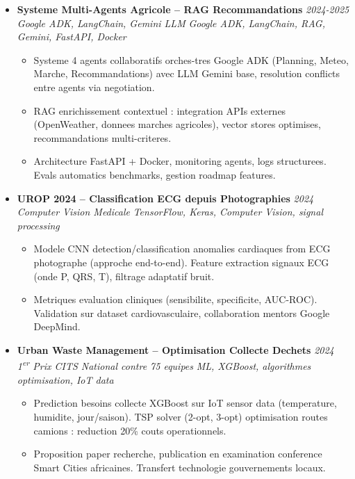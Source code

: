 \documentclass[a4paper,11pt]{article}
\begin{document}
\begin{itemize}[leftmargin=*, label={-}]
\item \textbf{Systeme Multi-Agents Agricole -- RAG Recommandations} \hfill \textit{2024-2025} \\
\textit{Google ADK, LangChain, Gemini LLM} \hfill \textit{Google ADK, LangChain, RAG, Gemini, FastAPI, Docker}
\vspace{-2pt}
    \begin{itemize}[leftmargin=0.4cm, nosep, label=\tiny$\bullet$]
        \item \small{Systeme 4 agents collaboratifs orches-tres Google ADK (Planning, Meteo, Marche, Recommandations) avec LLM Gemini base, resolution conflicts entre agents via negotiation.}
        \item \small{RAG enrichissement contextuel : integration APIs externes (OpenWeather, donnees marches agricoles), vector stores optimises, recommandations multi-criteres.}
        \item \small{Architecture FastAPI + Docker, monitoring agents, logs structurees. Evals automatics benchmarks, gestion roadmap features.}
    \end{itemize}
\vspace{3pt}

\item \textbf{UROP 2024 -- Classification ECG depuis Photographies} \hfill \textit{2024} \\
\textit{Computer Vision Medicale} \hfill \textit{TensorFlow, Keras, Computer Vision, signal processing}
\vspace{-2pt}
    \begin{itemize}[leftmargin=0.4cm, nosep, label=\tiny$\bullet$]
        \item \small{Modele CNN detection/classification anomalies cardiaques from ECG photographe (approche end-to-end). Feature extraction signaux ECG (onde P, QRS, T), filtrage adaptatif bruit.}
        \item \small{Metriques evaluation cliniques (sensibilite, specificite, AUC-ROC). Validation sur dataset cardiovasculaire, collaboration mentors Google DeepMind.}
    \end{itemize}
\vspace{3pt}

\item \textbf{Urban Waste Management -- Optimisation Collecte Dechets} \hfill \textit{2024} \\
\textit{1\textsuperscript{er} Prix CITS National contre 75 equipes} \hfill \textit{ML, XGBoost, algorithmes optimisation, IoT data}
\vspace{-2pt}
    \begin{itemize}[leftmargin=0.4cm, nosep, label=\tiny$\bullet$]
        \item \small{Prediction besoins collecte XGBoost sur IoT sensor data (temperature, humidite, jour/saison). TSP solver (2-opt, 3-opt) optimisation routes camions : reduction 20\% couts operationnels.}
        \item \small{Proposition paper recherche, publication en examination conference Smart Cities africaines. Transfert technologie gouvernements locaux.}
    \end{itemize}
\vspace{3pt}


\end{itemize}
\end{document}
